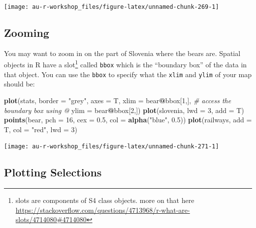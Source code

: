 \documentclass[]{book}
\newenvironment{Shaded}{\begin{snugshade}}{\end{snugshade}}
\newcommand{\KeywordTok}[1]{\textcolor[rgb]{0.13,0.29,0.53}{\textbf{#1}}}
\newcommand{\DataTypeTok}[1]{\textcolor[rgb]{0.13,0.29,0.53}{#1}}
\newcommand{\DecValTok}[1]{\textcolor[rgb]{0.00,0.00,0.81}{#1}}
\newcommand{\FloatTok}[1]{\textcolor[rgb]{0.00,0.00,0.81}{#1}}
\newcommand{\StringTok}[1]{\textcolor[rgb]{0.31,0.60,0.02}{#1}}
\newcommand{\CommentTok}[1]{\textcolor[rgb]{0.56,0.35,0.01}{\textit{#1}}}
\newcommand{\OperatorTok}[1]{\textcolor[rgb]{0.81,0.36,0.00}{\textbf{#1}}}
\newcommand{\NormalTok}[1]{#1}
\let\rmarkdownfootnote\footnote%
\def\footnote{\protect\rmarkdownfootnote}
\theoremstyle{definition}
\theoremstyle{definition}
\theoremstyle{definition}
\theoremstyle{remark}
\begin{document}
\begin{center}\texttt{[image: au-r-workshop\_files/figure-latex/unnamed-chunk-269-1]} \end{center}

\subsection{Zooming}\label{zoom}

You may want to zoom in on the part of Slovenia where the bears are.
Spatial objects in R have a slot\footnote{slots are components of S4
  class objects. more on that here
  \url{https://stackoverflow.com/questions/4713968/r-what-are-slots/4714080\#4714080}}
called \texttt{bbox} which is the ``boundary box'' of the data in that
object. You can use the \texttt{bbox} to specify what the \texttt{xlim}
and \texttt{ylim} of your map should be:

\begin{Shaded}
\begin{Highlighting}[]
\KeywordTok{plot}\NormalTok{(stats, }\DataTypeTok{border =} \StringTok{"grey"}\NormalTok{, }\DataTypeTok{axes =}\NormalTok{ T,}
     \DataTypeTok{xlim =}\NormalTok{ bear}\OperatorTok{@}\NormalTok{bbox[}\DecValTok{1}\NormalTok{,],  }\CommentTok{# access the boundary box using @}
     \DataTypeTok{ylim =}\NormalTok{ bear}\OperatorTok{@}\NormalTok{bbox[}\DecValTok{2}\NormalTok{,])}
\KeywordTok{plot}\NormalTok{(slovenia, }\DataTypeTok{lwd =} \DecValTok{3}\NormalTok{, }\DataTypeTok{add =}\NormalTok{ T)}
\KeywordTok{points}\NormalTok{(bear, }\DataTypeTok{pch =} \DecValTok{16}\NormalTok{, }\DataTypeTok{cex =} \FloatTok{0.5}\NormalTok{, }\DataTypeTok{col =} \KeywordTok{alpha}\NormalTok{(}\StringTok{"blue"}\NormalTok{, }\FloatTok{0.5}\NormalTok{))}
\KeywordTok{plot}\NormalTok{(railways, }\DataTypeTok{add =}\NormalTok{ T, }\DataTypeTok{col =} \StringTok{"red"}\NormalTok{, }\DataTypeTok{lwd =} \DecValTok{3}\NormalTok{)}
\end{Highlighting}
\end{Shaded}

\begin{center}\texttt{[image: au-r-workshop\_files/figure-latex/unnamed-chunk-271-1]} \end{center}

\subsection{Plotting Selections}\label{plot-selections}
\end{document}
